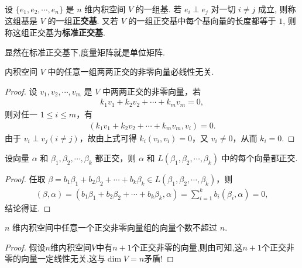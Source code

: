 \documentclass[../../main.tex]{subfiles}%
\begin{document}
\begin{definition}
设 $\{e_1, e_2, \cdots, e_n\}$ 是 $n$ 维内积空间 $V$ 的一组基. 若 $e_i \perp e_j$ 对一切 $i \neq j$ 成立, 则称这组基是 $V$ 的一组\textbf{正交基}. 又若 $V$ 的一组正交基中每个基向量的长度都等于 $1$, 则称这组正交基为\textbf{标准正交基}.
\end{definition}
\begin{note}
显然在标准正交基下,度量矩阵就是单位矩阵.
\end{note}

\begin{lemma}\label{lemma:正交向量组必线性无关}
内积空间 $V$ 中的任意一组两两正交的非零向量必线性无关.
\end{lemma}
\begin{proof}
设 $v_1, v_2, \cdots, v_m$ 是 $V$ 中两两正交的非零向量，若
\begin{align*}
k_1v_1 + k_2v_2 + \cdots + k_mv_m = 0,
\end{align*}
则对任一 $1 \leqslant  i \leqslant  m$，有
\begin{align*}
(k_1v_1 + k_2v_2 + \cdots + k_mv_m, v_i) = 0.
\end{align*}
由于 $v_i \perp v_j (i \neq j)$，故由上式可得 $k_i(v_i, v_i) = 0$，又 $v_i \neq 0$，从而 $k_i = 0$.
\end{proof}

\begin{lemma}\label{lemma:和基正交的向量一定和由基生成的空间正交}
设向量 $\alpha$ 和 $\beta_1, \beta_2, \cdots, \beta_k$ 都正交，则 $\alpha$ 和 $L(\beta_1, \beta_2, \cdots, \beta_k)$ 中的每个向量都正交.
\end{lemma}
\begin{proof}
任取 $\beta = b_1\beta_1 + b_2\beta_2 + \cdots + b_k\beta_k \in L(\beta_1, \beta_2, \cdots, \beta_k)$，则
\begin{align*}
(\beta, \alpha) = (b_1\beta_1 + b_2\beta_2 + \cdots + b_k\beta_k, \alpha) = \sum_{i = 1}^{k}b_i(\beta_i, \alpha) = 0,
\end{align*}
结论得证.
\end{proof}

\begin{corollary}
$n$ 维内积空间中任意一个正交非零向量组的向量个数不超过 $n$.
\end{corollary}
\begin{proof}
假设$n$维内积空间$V$中有$n+1$个正交非零的向量,则由可知,这$n+1$个正交非零的向量一定线性无关,这与$\dim V=n$矛盾!
\end{proof}
\end{document}
